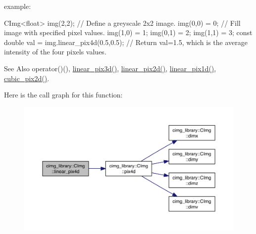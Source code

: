 \begin{DoxyParagraph}{example\-:}

\begin{DoxyCode}
CImg<float> img(2,2);     \textcolor{comment}{// Define a greyscale 2x2 image.}
img(0,0) = 0;             \textcolor{comment}{// Fill image with specified pixel values.}
img(1,0) = 1;
img(0,1) = 2;
img(1,1) = 3;
\textcolor{keyword}{const} \textcolor{keywordtype}{double} val = img.linear\_pix4d(0.5,0.5);  \textcolor{comment}{// Return val=1.5, which is the average intensity of the
       four pixels values.}
\end{DoxyCode}

\end{DoxyParagraph}
\begin{DoxySeeAlso}{See Also}
operator()(), \hyperlink{structcimg__library_1_1_c_img_a99af7b06c856fffc82a8872f2ebd5e8c}{linear\-\_\-pix3d()}, \hyperlink{structcimg__library_1_1_c_img_a94e74f9969caf1db1f862ec9c145ed29}{linear\-\_\-pix2d()}, \hyperlink{structcimg__library_1_1_c_img_a510052a861eff8b05a02ba2f4427ed62}{linear\-\_\-pix1d()}, \hyperlink{structcimg__library_1_1_c_img_ab26403a66e670b53ef8f706fe83247a7}{cubic\-\_\-pix2d()}. 
\end{DoxySeeAlso}


Here is the call graph for this function\-:
\nopagebreak
\begin{figure}[H]
\begin{center}
\leavevmode
\includegraphics[width=350pt]{structcimg__library_1_1_c_img_ad201bbecc0caabbe566ea7507cd657cf_cgraph}
\end{center}
\end{figure}


